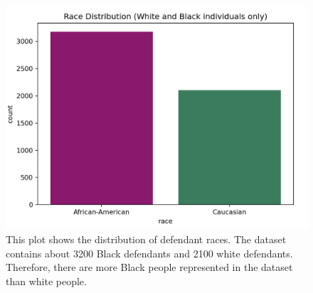 \documentclass[water,article,submit,moreauthors,pdftex]{mdpi}
\begin{document}
\begin{figure}

{\centering \includegraphics[width=1\linewidth]{../images/race_bar_plot_new}

}

\caption{This plot shows the distribution of defendant races. The dataset contains about 3200 Black defendants and 2100 white defendants. Therefore, there are more Black people represented in the dataset than white people.}\label{fig:race plot}
\end{figure}
\end{document}
